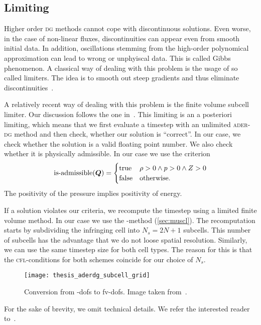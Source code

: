 \subsection{Limiting}\label{sec:limiting}
Higher order \textsc{dg} methods cannot cope with discontinuous solutions.
Even worse, in the case of non-linear fluxes, discontinuities can appear even from smooth initial data.
In addition, oscillations stemming from the high-order polynomical approximation can lead to wrong or unphyiscal data.
This is called Gibbs phenomenon.
A classical way of dealing with this problem is the usage of so called limiters.
The idea is to smooth out steep gradients and thus eliminate discontinuities~\cite{hesthaven2008nodal}.

A relatively recent way of dealing with this problem is the finite volume subcell limiter.
Our discussion follows the one in~\cite{dumbser2016simple}.
This limiting is an a posteriori limiting, which means that we first evaluate a timestep with an unlimited \textsc{ader-dg} method and then check, whether our solution is \enquote{correct}.
In our case, we check whether the solution is a valid floating point number.
We also check whether it is physically admissible.
In our case we use the criterion
\begin{equation}
  \label{eq:limiting-physical}
  \operatorname{is-admissible}(\bm{Q}) =
  \begin{cases}
    \text{true} & \rho > 0 \land p > 0 \land Z > 0 \\
    \text{false} & \text{otherwise}.
  \end{cases}
\end{equation}
The positivity of the pressure implies positivity of energy.

If a solution violates our criteria, we recompute the timestep using a limited finite volume method.
In our case we use the \muscl{}-method (\cref{sec:muscl}).
The recomputation starts by subdividing the infringing cell into $N_s = 2N + 1$ subcells.
This number of subcells has the advantage that we do not loose spatial resolution.
Similarly, we can use the same timestep size for both cell types.
The reason for this is that the \textsc{cfl}-conditions for both schemes  coincide for our choice of $N_s$.

\begin{figure}[htb]
  \centering
  \texttt{[image: thesis\_aderdg\_subcell\_grid]}
  \caption{\label{fig:limiting-subcells}Conversion from \dg{}-dofs to fv-dofs. Image taken from~\cite{dumbser2018conformal}. }
\end{figure}
For the sake of brevity, we omit technical details.
We refer the interested reader to~\cite{dumbser2016simple}.

